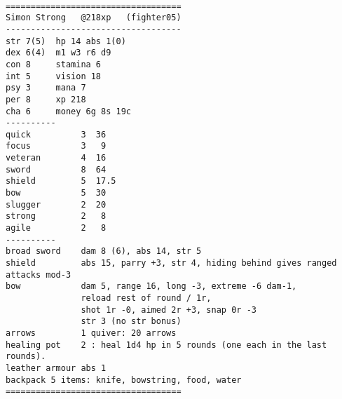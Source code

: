 \


\goodbreak
\tiny \begin{samepage} \begin{verbatim}
===================================
Simon Strong   @218xp   (fighter05)
-----------------------------------
str 7(5)  hp 14 abs 1(0)
dex 6(4)  m1 w3 r6 d9
con 8     stamina 6
int 5     vision 18
psy 3     mana 7
per 8     xp 218
cha 6     money 6g 8s 19c
----------
quick          3  36
focus          3   9
veteran        4  16
sword          8  64
shield         5  17.5
bow            5  30
slugger        2  20
strong         2   8
agile          2   8
----------
broad sword    dam 8 (6), abs 14, str 5
shield         abs 15, parry +3, str 4, hiding behind gives ranged attacks mod-3
bow            dam 5, range 16, long -3, extreme -6 dam-1,
               reload rest of round / 1r,
               shot 1r -0, aimed 2r +3, snap 0r -3
               str 3 (no str bonus)
arrows         1 quiver: 20 arrows
healing pot    2 : heal 1d4 hp in 5 rounds (one each in the last rounds).
leather armour abs 1
backpack 5 items: knife, bowstring, food, water
===================================
\end{verbatim} \end{samepage} \normalsize


\


